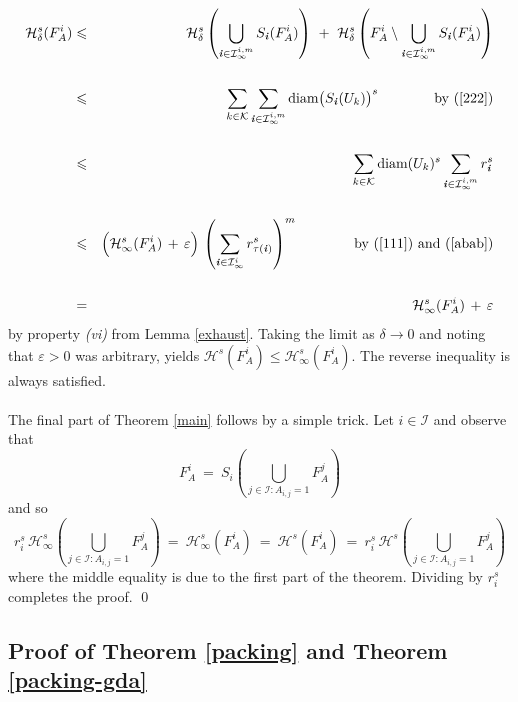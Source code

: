 \documentclass[11pt,english,british]{article}
\numberwithin{equation}{section}
\renewcommand{\leq}{\leqslant}
\begin{document}
\begin{eqnarray*}
\mathcal{H}^s_\delta(F_A^i)  &\leq&  \mathcal{H}^s_\delta \left(\bigcup_{\textbf{\emph{i}} \in \mathcal{I}^{i,m}_\infty}  S_\textbf{\emph{i}}(F_A^i)  \right) \ + \  \mathcal{H}^s_\delta \left(F_A^i \setminus \bigcup_{\textbf{\emph{i}} \in \mathcal{I}^{i,m}_\infty}  S_\textbf{\emph{i}}(F_A^i) \right) \\ \\
&\leq& \sum_{k \in \mathcal{K}} \sum_{\textbf{\emph{i}} \in \mathcal{I}^{i,m}_\infty} \text{diam}\big( S_\textbf{\emph{i}}(U_k) \big)^s  \qquad \qquad \text{by (\ref{222})} \\ \\
&\leq&  \sum_{k \in \mathcal{K}} \text{diam}( U_k )^s \sum_{\textbf{\emph{i}} \in \mathcal{I}^{i,m}_\infty} r_\textbf{\emph{i}}^s  \\ \\
&\leq& \Big(\mathcal{H}^s_\infty(F_A^i) \, + \, \varepsilon \Big) \, \left(\sum_{\textbf{\emph{i}} \in \mathcal{I}^{i}_\infty} r_{\tau(\textbf{\emph{i}})}^s\right)^m  \qquad \qquad \text{by (\ref{111}) and (\ref{abab})} \\ \\
&=& \mathcal{H}^s_\infty(F_A^i) \, + \, \varepsilon
\end{eqnarray*}
by property \emph{(vi)} from Lemma \ref{exhaust}.  Taking the limit as $\delta \to 0$ and noting that $\varepsilon>0$ was arbitrary, yields $\mathcal{H}^s(F_A^i)  \leq \mathcal{H}^s_\infty(F_A^i) $.  The reverse inequality is always satisfied.
\\ \\
The final part of Theorem \ref{main} follows by a simple trick. Let  $i \in \mathcal{I}$ and observe that
\[
F_A^i \ = \ S_i\left( \bigcup_{j \in \mathcal{I} : A_{i,j} = 1}  F_A^j \right)
\]
and so
\[
r_i^s \, \mathcal{H}_\infty^s  \left( \bigcup_{j \in \mathcal{I} : A_{i,j} = 1}  F_A^j \right) \  = \ \mathcal{H}_\infty^s (F_A^i)  \  = \  \mathcal{H}^s (F_A^i)  \  =  \  r_i^s \,  \mathcal{H}^s \left( \bigcup_{j \in \mathcal{I} : A_{i,j} = 1}  F_A^j \right)
\]
where the middle equality is due to the first part of the theorem.  Dividing by $r_i^s$ completes the proof.
\hfill \qed




\subsection{Proof of Theorem \ref{packing} and Theorem \ref{packing-gda}} \label{packingproof}
\end{document}
